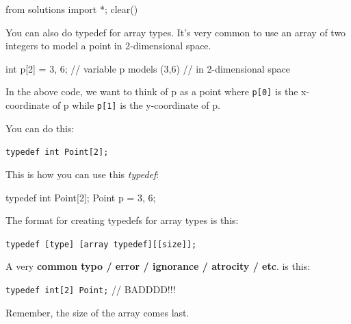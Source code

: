 \begin{python0}
from solutions import *; clear()
\end{python0}

You can also do typedef for array types. It's very
common to use an array of two integers to model a point in 2-dimensional
space.

\begin{consolethree}[escapeinside=||]
int p[2] = {3, 6}; // variable p models (3,6)
                   // in 2-dimensional space
\end{consolethree}

In the above code, we want to think of p as a point where \verb!p[0]! is
the x-coordinate of p while \verb!p[1]! is the y-coordinate of p.

You can do this:

\verb!typedef int Point[2];!

This is how you can use this \textit{typedef}:

\begin{consolethree}[escapeinside=||]
typedef int Point[2];
Point p = {3, 6};
\end{consolethree}

The format for creating typedefs for array types is this:

\verb!typedef [type] [array typedef][[size]];!

A very \textbf{common typo / error / ignorance / atrocity / etc}. is
this:

\verb!typedef int[2] Point;! // BADDDD!!!

Remember, the size of the array comes last.



